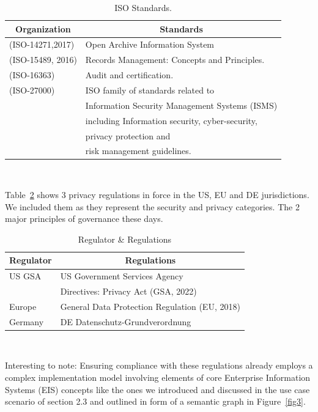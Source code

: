 \documentclass[runningheads]{llncs}
\begin{document}
\begin{table} [ht]
\caption{ISO Standards.}\label{tab2}
\begin{tabular}{|l|l|}
\multicolumn{1}{c}{\textbf{Organization}} & \multicolumn{1}{c}{\textbf{Standards}} \\ \hline
(ISO-14271,2017) & {Open Archive Information System} \\ \hline
(ISO-15489, 2016) & { Records Management: Concepts and Principles.}\\ \hline
(ISO-16363)  & {Audit and certification.} \\ \hline
(ISO-27000) & ISO family of standards related to \\
    & Information Security Management Systems (ISMS) \\ 
    & including Information security, cyber-security, \\
    & privacy protection and \\
    & risk management guidelines.\\ \hline
\end{tabular}
\end{table} 
\,  %

Table~\ref{tab3} shows 3 privacy regulations in force in the US, EU and DE jurisdictions. We included them as they represent the security and privacy categories. The 2 major principles of governance these days.

\begin{table}
\caption{Regulator \& Regulations}\label{tab3}
\begin{tabular}{|l|l|}
\multicolumn{1}{c}{\textbf{Regulator}} & \multicolumn{1}{c}{\textbf{Regulations}}\\ \hline
US GSA & US Government Services Agency \\
       & Directives: Privacy Act (GSA, 2022)\\ \hline
Europe & General Data Protection Regulation (EU, 2018)\\ \hline
Germany  & DE Datenschutz-Grundverordnung \\ \hline
\end{tabular}
\end{table}   
\,  %

Interesting to note: Ensuring compliance with these regulations already employs a complex implementation model involving elements of core Enterprise Information Systems (EIS) concepts like the ones we introduced and discussed in the use case scenario of section 2.3 and outlined in form of a semantic graph in Figure~\ref{fig3}.
\end{document}
